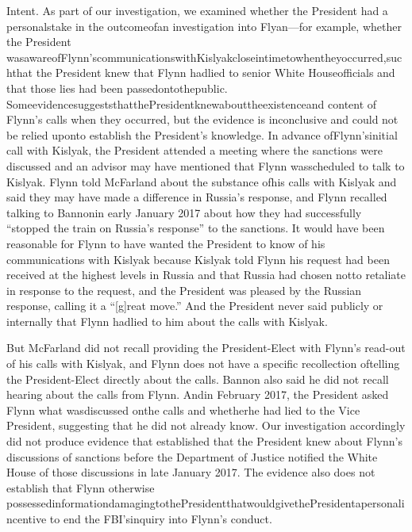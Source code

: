 Intent. As part of our investigation, we examined whether the President had a personalstake in the outcomeofan investigation into Flyan—for example, whether the President wasawareofFlynn’scommunicationswithKislyakcloseintimetowhentheyoccurred,suchthat the President knew that Flynn hadlied to senior White Houseofficials and that those lies had been passedontothepublic. SomeevidencesuggeststhatthePresidentknewabouttheexistenceand content of Flynn’s calls when they occurred, but the evidence is inconclusive and could not be relied uponto establish the President’s knowledge. In advance ofFlynn’sinitial call with Kislyak, the President attended a meeting where the sanctions were discussed and an advisor may have mentioned that Flynn wasscheduled to talk to Kislyak. Flynn told McFarland about the substance ofhis calls with Kislyak and said they may have made a difference in Russia’s response, and Flynn recalled talking to Bannonin early January 2017 about how they had successfully “stopped the train on Russia’s response” to the sanctions. It would have been reasonable for Flynn to have wanted the President to know of his communications with Kislyak because Kislyak told Flynn his request had been received at the highest levels in Russia and that Russia had chosen notto retaliate in response to the request, and the President was pleased by the Russian response, calling it a “[g]reat move.” And the President never said publicly or internally that Flynn hadlied to him about the calls with Kislyak.

But McFarland did not recall providing the President-Elect with Flynn’s read-out of his calls with Kislyak, and Flynn does not have a specific recollection oftelling the President-Elect directly about the calls. Bannon also said he did not recall hearing about the calls from Flynn. Andin February 2017, the President asked Flynn what wasdiscussed onthe calls and whetherhe had lied to the Vice President, suggesting that he did not already know. Our investigation accordingly did not produce evidence that established that the President knew about Flynn’s discussions of sanctions before the Department of Justice notified the White House of those discussions in late January 2017. The evidence also does not establish that Flynn otherwise possessedinformationdamagingtothePresidentthatwouldgivethePresidentapersonalincentive to end the FBI’sinquiry into Flynn’s conduct.

